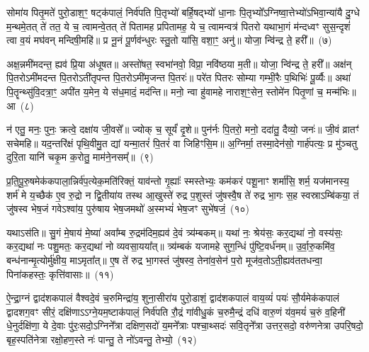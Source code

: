 {\anuvakamend[{ह॒रा॒ नि॒हारं॑ त्रि॒ꣳ॒शच्च॑}]}%

सोमा॑य पितृ॒मते॑ पुरो॒डाश॒ꣳ॒ षट्\-क॑पालं॒ निर्व॑पति पि॒तृभ्यो॑ बर्\mbox{}हि॒षद्भ्यो॑ धा॒नाः पि॒तृभ्यो᳚\-ऽग्निष्वा॒त्तेभ्यो॑\-ऽभिवा॒न्या॑यै दु॒ग्धे म॒न्थमे॒तत् ते॑ तत॒ ये च॒ त्वामन्वे॒तत् ते॑ पितामह प्रपितामह॒ ये च॒ त्वामन्वत्र॑ पितरो यथाभा॒गं म॑न्दध्वꣳ सुस॒न्दृशं॑ त्वा व॒यं मघ॑वन् मन्दिषी॒महि॑॥ प्र नू॒नं पू॒र्णव॑न्धुरः स्तु॒तो या॑सि॒ वशा॒ꣳ॒ अनु॑॥ योजा॒ न्वि॑न्द्र ते॒ हरी᳚॥~(७)

अक्ष॒न्नमी॑मदन्त॒ ह्यव॑ प्रि॒या अ॑धूषत॥ अस्तो॑षत॒ स्वभा॑नवो॒ विप्रा॒ नवि॑ष्ठया म॒ती॥ योजा॒ न्वि॑न्द्र ते॒ हरी᳚॥ अक्ष॑न् पि॒तरो\-ऽमी॑मदन्त पि॒तरो\-ऽती॑तृपन्त पि॒तरो\-ऽमी॑मृजन्त पि॒तरः॑॥ परे॑त पितरः सोम्या गम्भी॒रैः प॒थिभिः॑ पू॒र्व्यैः॥ अथा॑ पि॒तॄन्थ्सु॑वि॒दत्रा॒ꣳ॒ अपी॑त य॒मेन॒ ये स॑ध॒मादं॒ मद॑न्ति॥ मनो॒ न्वा हु॑वामहे नाराश॒ꣳ॒सेन॒ स्तोमे॑न पितृ॒णां च॒ मन्म॑भिः॥ आ~(८)

न॑ एतु॒ मनः॒ पुनः॒ क्रत्वे॒ दक्षा॑य जी॒वसे᳚॥ ज्योक् च॒ सूर्यं॑ दृ॒शे॥ पुन॑र्नः पि॒तरो॒ मनो॒ ददा॑तु॒ दैव्यो॒ जनः॑॥ जी॒वं व्रातꣳ॑ सचेमहि॥ यद॒न्तरि॑क्षं पृथि॒वीमु॒त द्यां यन्मा॒तरं॑ पि॒तरं॑ वा जिहिꣳसि॒म॥ अ॒ग्निर्मा॒ तस्मा॒देन॑सो॒ गार्\mbox{}ह॑पत्यः॒ प्र मु॑ञ्चतु दुरि॒ता यानि॑ चकृ॒म क॒रोतु॒ माम॑ने॒नसम्᳚॥~(९)

{\anuvakamend[{हरी॒ मन्म॑भि॒रा चतु॑श्चत्वारिꣳशच्च}]}%

प्र॒ति॒पू॒रु॒षमेक॑कपाला॒न्निर्व॑प॒त्येक॒\-मति॑रिक्तं॒ याव॑न्तो गृ॒ह्याः᳚ स्मस्तेभ्यः॒ कम॑करं पशू॒नाꣳ शर्मा॑सि॒ शर्म॒ यज॑मानस्य॒ शर्म॑ मे य॒च्छैक॑ ए॒व रु॒द्रो न द्वि॒तीया॑य तस्थ आ॒खुस्ते॑ रुद्र प॒शुस्तं जु॑षस्वै॒ष ते॑ रुद्र भा॒गः स॒ह स्वस्रा\-ऽम्बि॑कया॒ तं जु॑षस्व भेष॒जं गवे\-ऽश्वा॑य॒ पुरु॑षाय भेष॒जमथो॑ अ॒स्मभ्यं॑ भेष॒जꣳ सुभे॑षजं॒~(१०)

यथा\-ऽस॑ति॥ सु॒गं मे॒षाय॑ मे॒ष्या॑ अवा᳚म्ब रु॒द्रम॑दिम॒ह्यव॑ दे॒वं त्र्य॑म्बकम्॥ यथा॑ नः॒ श्रेय॑सः॒ कर॒द्यथा॑ नो॒ वस्य॑सः॒ कर॒द्यथा॑ नः पशु॒मतः॒ कर॒द्यथा॑ नो व्यवसा॒यया᳚त्॥ त्र्य॑म्बकं यजामहे सुग॒न्धिं पु॑ष्टि॒वर्ध॑नम्॥ उ॒र्वा॒रु॒कमि॑व॒ बन्ध॑नान्मृ॒त्योर्मु॑क्षीय॒ मा\-ऽमृता᳚त्॥ ए॒ष ते॑ रुद्र भा॒गस्तं जु॑षस्व॒ तेना॑व॒सेन॑ प॒रो मूज॑व॒तो\-ऽती॒ह्यव॑ततधन्वा॒ पिना॑कहस्तः॒ कृत्ति॑वासाः॥~(११)

{\anuvakamend[{सुभे॑षजमिहि॒ त्रीणि॑ च}]}%

ऐ॒न्द्रा॒ग्नं द्वाद॑श\-कपालं वैश्वदे॒वं च॒रुमिन्द्रा॑य॒ शुना॒सीरा॑य पुरो॒डाशं॒ द्वाद॑श\-कपालं वाय॒व्यं॑ पयः॑ सौ॒र्यमेक॑कपालं द्वादशग॒वꣳ सीरं॒ दक्षि॑णा\-ऽ\-ऽग्ने॒यम॒ष्टा\-क॑पालं॒ निर्व॑पति रौ॒द्रं गा॑वीधु॒कं च॒रुमै॒न्द्रं दधि॑ वारु॒णं य॑व॒मयं॑ च॒रुं व॒हिनी॑ धे॒नुर्दक्षि॑णा॒ ये दे॒वाः पु॑रः॒सदो॒\-ऽग्निने᳚त्रा दक्षिण॒सदो॑ य॒मने᳚त्राः पश्चा॒थ्सदः॑ सवि॒तृने᳚त्रा उत्तर॒सदो॒ वरु॑णनेत्रा उपरि॒षदो॒ बृह॒स्पति॑नेत्रा रक्षो॒हण॒स्ते नः॑ पान्तु॒ ते नो॑\-ऽवन्तु॒ तेभ्यो॒~(१२)


